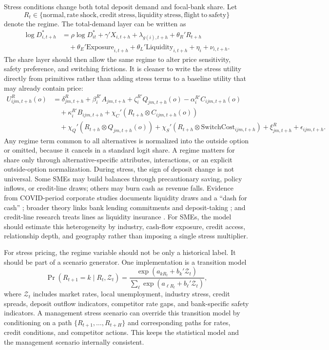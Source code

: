 \documentclass[11pt]{article}
\begin{document}
Stress conditions change both total deposit demand and focal-bank share. Let
\[
  R_t\in
  \{\mathrm{normal},\mathrm{rate\ shock},\mathrm{credit\ stress},
  \mathrm{liquidity\ stress},\mathrm{flight\ to\ safety}\}
\]
denote the regime. The total-demand layer can be written as
\[
\begin{aligned}
  \log D_{i,t+h}^{*}
  &=
  \rho \log D_{it}^{*}
  +\gamma'X_{i,t+h}
  +\lambda_{g(i),t+h}
  +\theta_R'R_{t+h} \\
  &\quad
  +\theta_E'\mathrm{Exposure}_{i,t+h}
  +\theta_L'\mathrm{Liquidity}_{i,t+h}
  +\eta_i+\nu_{i,t+h}.
\end{aligned}
\]
The share layer should then allow the same regime to alter price sensitivity,
safety preference, and switching frictions. It is cleaner to write the stress
utility directly from primitives rather than adding stress terms to a baseline
utility that may already contain price:
\[
\begin{aligned}
  U_{ijm,t+h}^{R}(o)
  &=
  \delta_{jm,t+h}^{R}
  +\beta_i^{R\prime}A_{jm,t+h}
  +\zeta_i^{R\prime}Q_{jm,t+h}(o)
  -\alpha_i^{R\prime}C_{ijm,t+h}(o) \\
  &\quad
  +\kappa_i^{R\prime}B_{ijm,t+h}
  +\chi_C'(R_{t+h}\otimes C_{ijm,t+h}(o))\\
  &\quad
  +\chi_Q'(R_{t+h}\otimes Q_{jm,t+h}(o))
  +\chi_S'(R_{t+h}\otimes \mathrm{SwitchCost}_{ijm,t+h})
  +\xi_{jm,t+h}^{R}
  +\epsilon_{ijm,t+h}.
\end{aligned}
\]
Any regime term common to all alternatives is normalized into the outside
option or omitted, because it cancels in a standard logit share. A regime
matters for share only through alternative-specific attributes, interactions,
or an explicit outside-option normalization.
During stress, the sign of deposit change is not universal. Some SMEs may build
balances through precautionary saving, policy inflows, or credit-line draws;
others may burn cash as revenue falls. Evidence from COVID-period corporate
studies documents liquidity draws and a ``dash for cash''
\citep{acharya2020dash,li2020banks}; broader theory links bank lending
commitments and deposit-taking \citep{kashyap2002liquidity}; and credit-line
research treats lines as liquidity insurance
\citep{sufi2009creditlines,acharya2014creditlines}. For SMEs, the model should
estimate this heterogeneity by industry, cash-flow exposure, credit access,
relationship depth, and geography rather than imposing a single stress
multiplier.

For stress pricing, the regime variable should not be only a historical label.
It should be part of a scenario generator. One implementation is a transition
model
\[
  \Pr(R_{t+1}=k\mid R_t,\mathcal{Z}_t)
  =
  \frac{\exp(a_{kR_t}+b_k'\mathcal{Z}_t)}
       {\sum_{\ell}\exp(a_{\ell R_t}+b_\ell'\mathcal{Z}_t)},
\]
where $\mathcal{Z}_t$ includes market rates, local unemployment, industry
stress, credit spreads, deposit outflow indicators, competitor rate gaps, and
bank-specific safety indicators. A management stress scenario can override this
transition model by conditioning on a path
$\{R_{t+1},\ldots,R_{t+H}\}$ and corresponding paths for rates, credit
conditions, and competitor actions. This keeps the statistical model and the
management scenario internally consistent.
\end{document}
